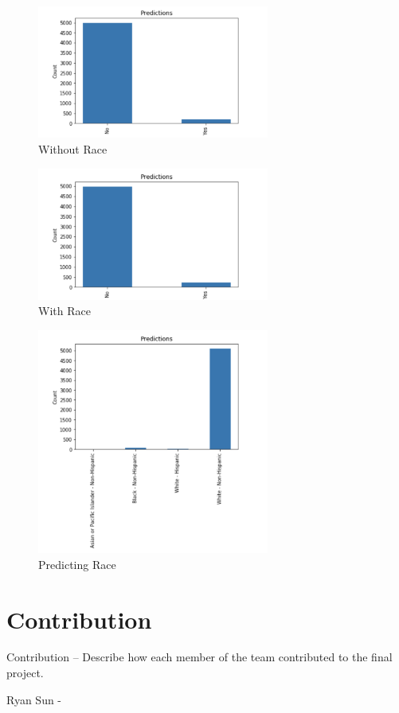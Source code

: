 \documentclass[11pt, sigconf]{acmart}
\begin{document}
\begin{figure}[h] 	
\centering
\includegraphics[width=3in]{2.png}
\caption{Without Race}
\end{figure}

\begin{figure}[h] 	
\centering
\includegraphics[width=3in]{3.png}
\caption{With Race}
\end{figure}

\begin{figure}[h] 	
\centering
\includegraphics[width=3in]{4.png}
\caption{Predicting Race}
\end{figure}

\section{Contribution}
Contribution – Describe how each member of the team contributed to the final project.

Ryan Sun - 
\end{document}
